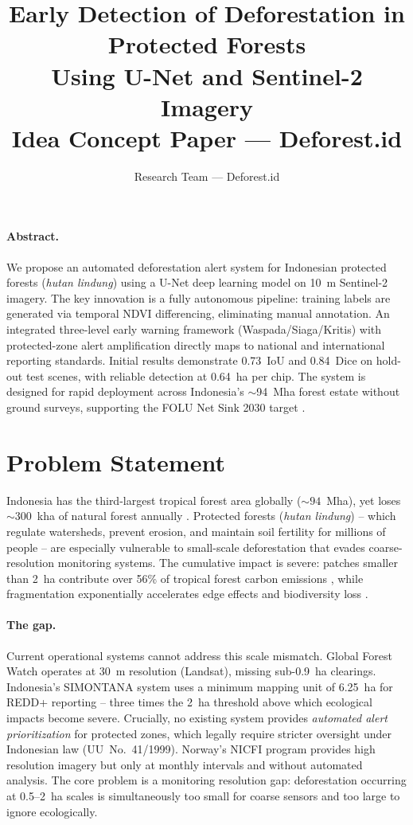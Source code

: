 \documentclass[10pt,a4paper,onecolumn]{article}
\title{\textbf{Early Detection of Deforestation in Protected Forests \\
Using U-Net and Sentinel-2 Imagery} \\
\small Idea Concept Paper --- Deforest.id}
\author{Research Team --- Deforest.id}
\date{}
\begin{document}
\maketitle
\thispagestyle{empty}

\paragraph{Abstract.}
We propose an automated deforestation alert system for Indonesian
protected forests (\textit{hutan lindung}) using a U-Net deep
learning model on 10~m Sentinel-2 imagery. The key innovation is
a fully autonomous pipeline: training labels are generated via
temporal NDVI differencing, eliminating manual annotation. An
integrated three-level early warning framework (Waspada/Siaga/Kritis)
with protected-zone alert amplification directly maps to national
and international reporting standards. Initial results demonstrate
0.73~IoU and 0.84~Dice on hold-out test scenes, with reliable
detection at 0.64~ha per chip. The system is designed for rapid
deployment across Indonesia's $\sim$94~Mha forest estate without
ground surveys, supporting the FOLU Net Sink 2030 target \cite{menlhk2022folu}.

\section{Problem Statement}
Indonesia has the third-largest tropical forest area globally
($\sim94$~Mha), yet loses $\sim300$~kha of natural forest annually
\cite{hansen2013high,fao2022sofo}. Protected forests (\textit{hutan lindung}) --
which regulate watersheds, prevent erosion, and maintain soil
fertility for millions of people -- are especially vulnerable to
small-scale deforestation that evades coarse-resolution monitoring
systems. The cumulative impact is severe: patches smaller than
2~ha contribute over 56\% of tropical forest carbon emissions
\cite{xu2026nature}, while fragmentation exponentially accelerates
edge effects and biodiversity loss \cite{taubert2018fragmentation}.

\paragraph{The gap.}
Current operational systems cannot address this scale mismatch.
Global Forest Watch operates at 30~m resolution (Landsat), missing
sub-0.9~ha clearings. Indonesia's SIMONTANA system uses a minimum
mapping unit of 6.25~ha for REDD+ reporting
\cite{gfw2024simontana,unfccc2022indonesia} -- three times the 2~ha threshold above
which ecological impacts become severe. Crucially, no existing
system provides \textit{automated alert prioritization} for
protected zones, which legally require stricter oversight under
Indonesian law (UU~No.~41/1999). Norway's NICFI program \cite{nicfi2020} provides
high resolution imagery but only at monthly intervals and without
automated analysis. The core problem is a monitoring resolution
gap: deforestation occurring at 0.5--2~ha scales is simultaneously
too small for coarse sensors and too large to ignore ecologically.
\end{document}
